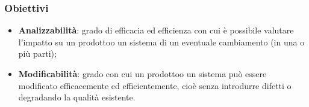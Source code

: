         \subsubsection{Obiettivi}
        \begin{itemize}
            \item \textbf{Analizzabilità}: grado di efficacia ed efficienza con cui è possibile valutare l'impatto su un prodotto\glosp o un sistema di un eventuale cambiamento (in una o più parti);
            \item \textbf{Modificabilità}: grado con cui un prodotto\glosp o un sistema può essere modificato efficacemente ed efficientemente, cioè senza introdurre difetti o degradando la qualità esistente.
        \end{itemize}
            
